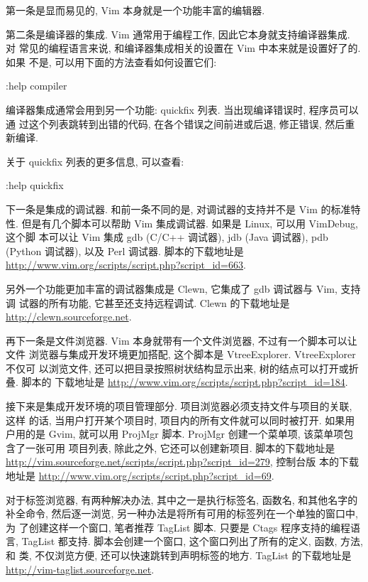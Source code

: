 第一条是显而易见的, Vim 本身就是一个功能丰富的编辑器.

第二条是编译器的集成. Vim 通常用于编程工作, 因此它本身就支持编译器集成. 对
常见的编程语言来说, 和编译器集成相关的设置在 Vim 中本来就是设置好了的. 如果
不是, 可以用下面的方法查看如何设置它们:
\begin{vimcode}
:help compiler
\end{vimcode}
编译器集成通常会用到另一个功能: quickfix 列表. 当出现编译错误时, 程序员可以通
过这个列表跳转到出错的代码, 在各个错误之间前进或后退, 修正错误, 然后重新编译.

关于 quickfix 列表的更多信息, 可以查看:
\begin{vimcode}
:help quickfix
\end{vimcode}

下一条是集成的调试器. 和前一条不同的是, 对调试器的支持并不是 Vim 的标准特性.
但是有几个脚本可以帮助 Vim 集成调试器. 如果是 Linux, 可以用 VimDebug, 这个脚
本可以让 Vim 集成 gdb (C/C++ 调试器), jdb (Java 调试器), pdb (Python 调试器),
以及 Perl 调试器. 脚本的下载地址是
\url{http://www.vim.org/scripts/script.php?script_id=663}.

另外一个功能更加丰富的调试器集成是 Clewn, 它集成了 gdb 调试器与 Vim, 支持调
试器的所有功能, 它甚至还支持远程调试. Clewn 的下载地址是
\url{http://clewn.sourceforge.net}.

再下一条是文件浏览器. Vim 本身就带有一个文件浏览器, 不过有一个脚本可以让文件
浏览器与集成开发环境更加搭配, 这个脚本是 VtreeExplorer. VtreeExplorer 不仅可
以浏览文件, 还可以把目录按照树状结构显示出来, 树的结点可以打开或折叠. 脚本的
下载地址是 \url{http://www.vim.org/scripts/script.php?script_id=184}.

接下来是集成开发环境的项目管理部分. 项目浏览器必须支持文件与项目的关联, 这样
的话, 当用户打开某个项目时, 项目内的所有文件就可以同时被打开. 如果用户用的是
Gvim, 就可以用 ProjMgr 脚本. ProjMgr 创建一个菜单项, 该菜单项包含了一张可用
项目列表, 除此之外, 它还可以创建新项目. 脚本的下载地址是
\url{http://vim.sourceforge.net/scripts/script.php?script_id=279}, 控制台版
本的下载地址是 \url{http://www.vim.org/scripts/script.php?script_id=69}.

对于标签浏览器, 有两种解决办法, 其中之一是执行标签名, 函数名, 和其他名字的
补全命令, 然后逐一浏览, 另一种办法是将所有可用的标签列在一个单独的窗口中, 为
了创建这样一个窗口, 笔者推荐 TagList 脚本. 只要是 Ctags 程序支持的编程语言,
TagList 都支持. 脚本会创建一个窗口, 这个窗口列出了所有的定义, 函数, 方法, 和
类, 不仅浏览方便, 还可以快速跳转到声明标签的地方. TagList 的下载地址是
\url{http://vim-taglist.sourceforge.net}.

